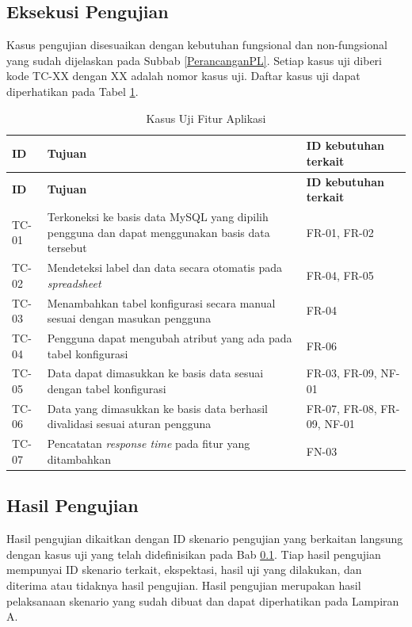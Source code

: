 	\subsection{Eksekusi Pengujian} \label{skenarioujian}
	Kasus pengujian disesuaikan dengan kebutuhan fungsional dan non-fungsional yang sudah dijelaskan pada Subbab \ref{PerancanganPL}. Setiap kasus uji diberi kode TC-XX dengan XX adalah nomor kasus uji. Daftar kasus uji dapat diperhatikan pada Tabel \ref{KasusUjiFA}.

	\begin{small}
	\begin{longtable}{ | p{2cm} | p{8cm} | p{3cm} | }
	    \caption{Kasus Uji Fitur Aplikasi}
	    \label{KasusUjiFA}\\ \hline
	    \centering\bfseries{ID} & \centering\bfseries{Tujuan} & \centering\bfseries{ID kebutuhan terkait} \tabularnewline \hline
	    \endfirsthead
	    \hline
	    \centering\bfseries{ID} & \centering\bfseries{Tujuan} & \centering\bfseries{ID kebutuhan terkait} \tabularnewline \hline
	    \endhead
		TC-01 & Terkoneksi ke basis data MySQL yang dipilih pengguna dan dapat menggunakan basis data tersebut& FR-01, FR-02 \\ \hline
		TC-02 & Mendeteksi label dan data secara otomatis pada \textit{spreadsheet} & FR-04, FR-05 \\ \hline
		TC-03 & Menambahkan tabel konfigurasi secara manual sesuai dengan masukan pengguna & FR-04 \\ \hline
		TC-04 & Pengguna dapat mengubah atribut yang ada pada tabel konfigurasi & FR-06 \\ \hline
		TC-05 & Data dapat dimasukkan ke basis data sesuai dengan tabel konfigurasi & FR-03, FR-09, NF-01 \\ \hline
		TC-06 & Data yang dimasukkan ke basis data berhasil divalidasi sesuai aturan pengguna & FR-07, FR-08, FR-09, NF-01 \\ \hline	
		TC-07 & Pencatatan \textit{response time} pada fitur yang ditambahkan & FN-03 \\ \hline
	\end{longtable}
	\end{small}

	\subsection{Hasil Pengujian}
	Hasil pengujian dikaitkan dengan ID skenario pengujian yang berkaitan langsung dengan kasus uji yang telah didefinisikan pada Bab \ref{skenarioujian}. Tiap hasil pengujian mempunyai ID skenario terkait, ekspektasi, hasil uji yang dilakukan, dan diterima atau tidaknya hasil pengujian. Hasil pengujian merupakan hasil pelaksanaan skenario yang sudah dibuat dan dapat diperhatikan pada Lampiran A.
